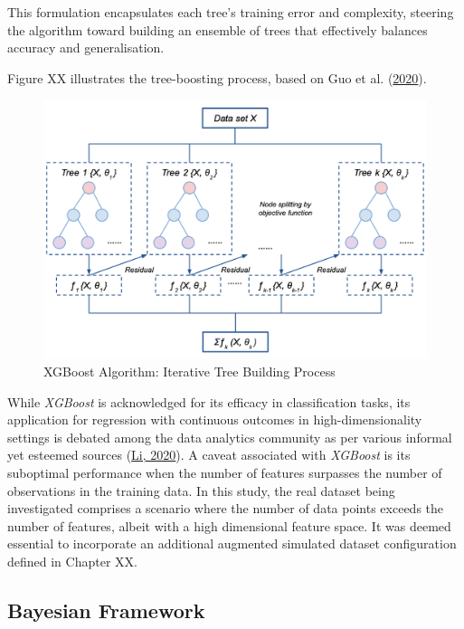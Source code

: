 \documentclass[
  11pt,
]{article}
\begin{document}
This formulation encapsulates each tree's training error and complexity,
steering the algorithm toward building an ensemble of trees that
effectively balances accuracy and generalisation.

Figure XX illustrates the tree-boosting process, based on Guo et al.
(\protect\hyperlink{ref-Guo2020}{2020}).

\begin{figure}[H]

{\centering \includegraphics[width=0.9\linewidth]{xgboost_flow} 

}

\caption{XGBoost Algorithm: Iterative Tree Building Process}\label{fig:XGBoost flow}
\end{figure}

While \emph{XGBoost} is acknowledged for its efficacy in classification
tasks, its application for regression with continuous outcomes in
high-dimensionality settings is debated among the data analytics
community as per various informal yet esteemed sources
(\protect\hyperlink{ref-Li2020}{Li, 2020}). A caveat associated with
\emph{XGBoost} is its suboptimal performance when the number of features
surpasses the number of observations in the training data. In this
study, the real dataset being investigated comprises a scenario where
the number of data points exceeds the number of features, albeit with a
high dimensional feature space. It was deemed essential to incorporate
an additional augmented simulated dataset configuration defined in
Chapter XX.

\subsection{Bayesian Framework}
\end{document}

